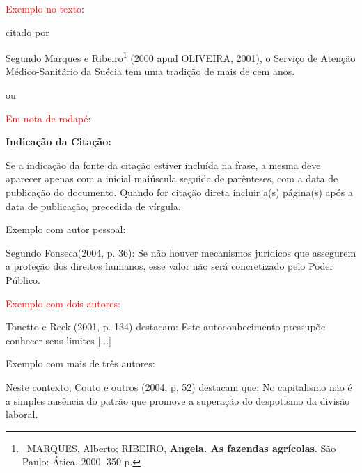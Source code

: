 \bigskip

{\sffamily
\textrm{\textcolor{red}{Exemplo no texto}}\textrm{:}}

\bigskip

{\sffamily
\textrm{citado por }}

\bigskip

{\sffamily
\textrm{Segundo Marques e Ribeiro}\footnote{\ MARQUES, Alberto; RIBEIRO, \textbf{Angela. As fazendas agrícolas}. São
Paulo: Ática, 2000. 350 p.}\textrm{ (2000 }\textrm{\textcolor{black}{apud }}\textrm{OLIVEIRA, 2001),  o Serviço de
Atenção Médico-Sanitário da Suécia tem uma tradição de mais de cem anos. }}

\bigskip

{\color{red}
ou}

{\sffamily
\textrm{\textcolor{red}{Em nota de rodapé}}\textrm{:}}

\bigskip

{\centering\bfseries\color{red}
Indicação da Citação:
\par}

\bigskip

{\sffamily
\textrm{Se a indicação da fonte da citação estiver incluída na frase, a mesma deve aparecer apenas com a inicial
maiúscula seguida de parênteses, com a data de publicação do }\textrm{documento. Quando for citação direta incluir a(s)
página(s) após a data de publicação, precedida de vírgula.}}

\bigskip

{\color{red}
Exemplo com autor pessoal:}

\bigskip

Segundo Fonseca(2004, p. 36): {\textquotedbl}Se não houver mecanismos jurídicos que assegurem a proteção dos direitos
humanos, esse valor não será concretizado pelo Poder Público.{\textquotedbl}\\

\bigskip

{\sffamily
\textrm{\textcolor{red}{Exemplo com dois autores: }}}

\bigskip

Tonetto e Reck (2001, p. 134) destacam: {\textquotedbl}Este autoconhecimento pressupõe conhecer seus limites
[...]{\textquotedbl} \\

\bigskip

{\color{red}
Exemplo com mais de três autores:}

\bigskip

Neste contexto, Couto e outros (2004, p. 52) destacam que: {\textquotedbl}No capitalismo não é a simples ausência do
patrão que promove a superação do despotismo da divisão laboral.{\textquotedbl}\\

